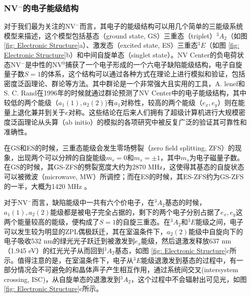 \documentclass[type = bachelor, oneside]{whu-thesis}
\begin{document}
\subsubsection{NV$^-$的电子能级结构}
对于我们最为关注的NV$^-$而言，其电子的能级结构可以用几个简单的三能级系统模型来描述，这个模型包括基态（ground state, GS）三重态（triplet）$^3A_2$（如图 \ref{fig: Electronic Structure}a）、激发态（excited state, ES）三重态$^3E$（如图 \ref{fig: Electronic Structure}b）和中间自旋单态（singlet state）。NV Center的负电荷状态NV$^-$是中性的NV$^0$捕获了一个电子形成的一个六电子缺陷能级结构，电子自旋量子数$S=1$的体系，这个结构可以通过各种方式在理论上进行模拟和验证，包括密度泛函理论、群论等方法\cite{Lenef1996,Goss1997, Maze2011, Hossain2008, Gali2009a}。其中群论是一个非常强大且实用的工具，A. lenef和S. C. Rand在1996年的时候就通过群论预测了NV Center中的电子能级结构，其中较低的两个能级（$a_1(1), a_2(2)$)有$a_1$对称性，较高的两个能级（$e_x, e_y$）则在能量上退化兼并到关于$e$对称\cite{Lenef1996}。这些结论在后来人们拥有了超级计算机进行大规模密度泛函理论从头算（ab initio）的模拟的各项研究中被反复广泛的验证其可靠性和准确性\cite{Gali2009, Zou2024}。

在GS和ES的时候，三重态能级会发生零场劈裂（zero field splitting, ZFS）的现象，出现两个可以分辨的自旋能级$m_s=0$和$m_s=±1$，其中$m_s$为电子磁量子数。在GS的时候，其GS-ZFS的劈裂宽度大约为2870 \unit{\MHz}，这使得其基态的自旋状态可以被微波（microwave, MW）所调控；而在ES的时候，其ES-ZFS约为GS-ZFS的一半，大概为1420 \unit{\MHz} \cite{Gruber1997,Neumann2009}。

对于NV$^-$而言，缺陷能级中一共有六个价电子，在$^3A_2$基态的时候，$a_1(1), a_2(2)$能级都是被电子完全占据的，剩下的两个电子分别占据了$e_x, e_y$这两个能量较高的能级，便构成了$S=1$的自旋三重态。在$^3A_2$和$^3E$能级之间，电子可以发生较为明显的ZPL偶极跃迁，其在室温条件下，$a_2(2)$能级中自旋向下的电子吸收532 nm的绿光光子跃迁到被激发到$e_x$能级，然后退激发释放637 nm （1.945 \unit{\eV}）的红光光子从而回到$^3A_2$基态，如图 \ref{fig: Electronic Structure}c所示。值得注意的是，在室温条件下，电子从$^3E$能级退激发到基态的过程中，有一部分情况会不可避免的和晶体声子产生相互作用，通过系统间交叉(intersystem crossing, ISC)，从自旋单态的退激发到$^3A_2$，这个过程中不会辐射出可见光，如图 \ref{fig: Electronic Structure}c所示。
\end{document}

